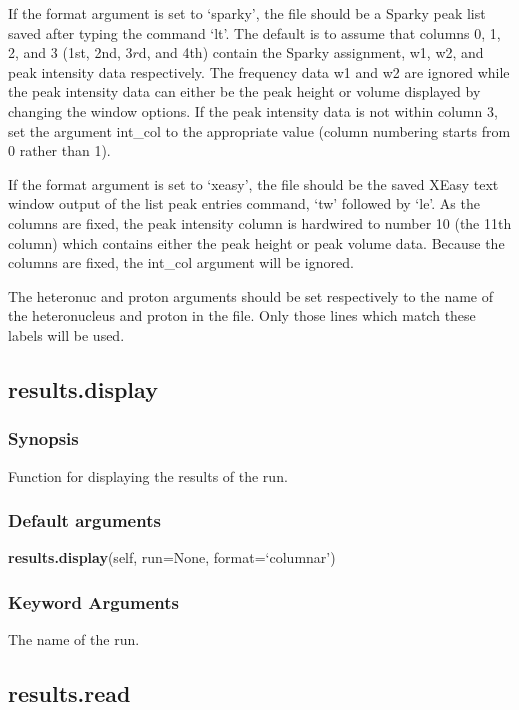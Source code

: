 If the format argument is set to `sparky', the file should be a Sparky peak list saved after
typing the command `lt'.  The default is to assume that columns 0, 1, 2, and 3 (1st, 2nd,
3$r$d, and 4th) contain the Sparky assignment, w1, w2, and peak intensity data respectively.
The frequency data w1 and w2 are ignored while the peak intensity data can either be the
peak height or volume displayed by changing the window options.  If the peak intensity data
is not within column 3, set the argument int\_col to the appropriate value (column numbering
starts from 0 rather than 1).

If the format argument is set to `xeasy', the file should be the saved XEasy text window
output of the list peak entries command, `tw' followed by `le'.  As the columns are fixed,
the peak intensity column is hardwired to number 10 (the 11th column) which contains either
the peak height or peak volume data.  Because the columns are fixed, the int\_col argument
will be ignored.


The heteronuc and proton arguments should be set respectively to the name of the
heteronucleus and proton in the file.  Only those lines which match these labels will be
used.


\newpage

\subsection{results.display}


\subsubsection{Synopsis}

Function for displaying the results of the run.

\subsubsection{Default arguments}

\textsf{\textbf{results.display}(self, run=None, format=`columnar')}


\subsubsection{Keyword Arguments}

  The name of the run.


\newpage

\subsection{results.read}


